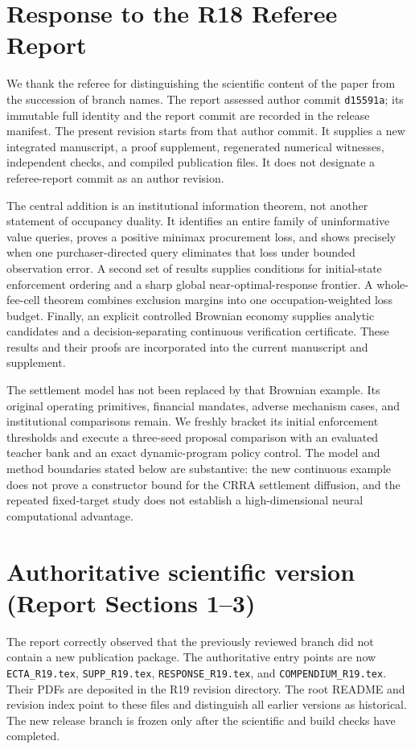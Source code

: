 \section*{Response to the R18 Referee Report}
We thank the referee for distinguishing the scientific content of the paper from the succession of branch names. The report assessed author commit \texttt{d15591a}; its immutable full identity and the report commit are recorded in the release manifest. The present revision starts from that author commit. It supplies a new integrated manuscript, a proof supplement, regenerated numerical witnesses, independent checks, and compiled publication files. It does not designate a referee-report commit as an author revision.

The central addition is an institutional information theorem, not another statement of occupancy duality. It identifies an entire family of uninformative value queries, proves a positive minimax procurement loss, and shows precisely when one purchaser-directed query eliminates that loss under bounded observation error. A second set of results supplies conditions for initial-state enforcement ordering and a sharp global near-optimal-response frontier. A whole-fee-cell theorem combines exclusion margins into one occupation-weighted loss budget. Finally, an explicit controlled Brownian economy supplies analytic candidates and a decision-separating continuous verification certificate. These results and their proofs are incorporated into the current manuscript and supplement.

The settlement model has not been replaced by that Brownian example. Its original operating primitives, financial mandates, adverse mechanism cases, and institutional comparisons remain. We freshly bracket its initial enforcement thresholds and execute a three-seed proposal comparison with an evaluated teacher bank and an exact dynamic-program policy control. The model and method boundaries stated below are substantive: the new continuous example does not prove a constructor bound for the CRRA settlement diffusion, and the repeated fixed-target study does not establish a high-dimensional neural computational advantage.

\section{Authoritative scientific version (Report Sections 1--3)}
The report correctly observed that the previously reviewed branch did not contain a new publication package. The authoritative entry points are now \texttt{ECTA\_R19.tex}, \texttt{SUPP\_R19.tex}, \texttt{RESPONSE\_R19.tex}, and \texttt{COMPENDIUM\_R19.tex}. Their PDFs are deposited in the R19 revision directory. The root README and revision index point to these files and distinguish all earlier versions as historical. The new release branch is frozen only after the scientific and build checks have completed.

